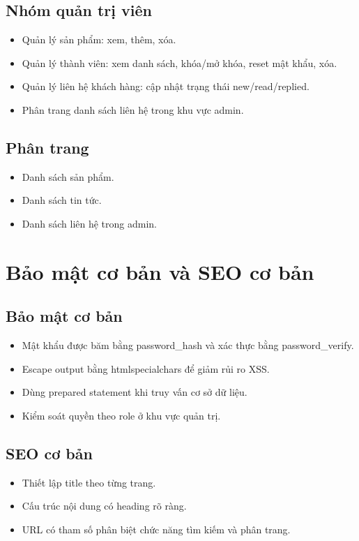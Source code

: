 \documentclass[12pt,a4paper]{article}
\begin{document}
\subsection{Nhóm quản trị viên}
\begin{itemize}
  \item Quản lý sản phẩm: xem, thêm, xóa.
  \item Quản lý thành viên: xem danh sách, khóa/mở khóa, reset mật khẩu, xóa.
  \item Quản lý liên hệ khách hàng: cập nhật trạng thái new/read/replied.
  \item Phân trang danh sách liên hệ trong khu vực admin.
\end{itemize}

\subsection{Phân trang}
\begin{itemize}
  \item Danh sách sản phẩm.
  \item Danh sách tin tức.
  \item Danh sách liên hệ trong admin.
\end{itemize}

\section{Bảo mật cơ bản và SEO cơ bản}

\subsection{Bảo mật cơ bản}
\begin{itemize}
  \item Mật khẩu được băm bằng password\_hash và xác thực bằng password\_verify.
  \item Escape output bằng htmlspecialchars để giảm rủi ro XSS.
  \item Dùng prepared statement khi truy vấn cơ sở dữ liệu.
  \item Kiểm soát quyền theo role ở khu vực quản trị.
\end{itemize}

\subsection{SEO cơ bản}
\begin{itemize}
  \item Thiết lập title theo từng trang.
  \item Cấu trúc nội dung có heading rõ ràng.
  \item URL có tham số phân biệt chức năng tìm kiếm và phân trang.
\end{itemize}
\end{document}

